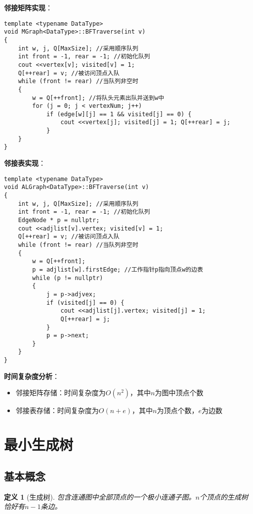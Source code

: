 \documentclass[12pt,a4paper]{amsart}
\newtheorem{definition}{定义}[section]
\begin{document}
\textbf{邻接矩阵实现}：
\begin{lstlisting}[caption=邻接矩阵的广度优先遍历]
template <typename DataType>
void MGraph<DataType>::BFTraverse(int v)
{
    int w, j, Q[MaxSize]; //采用顺序队列
    int front = -1, rear = -1; //初始化队列
    cout <<vertex[v]; visited[v] = 1;
    Q[++rear] = v; //被访问顶点入队
    while (front != rear) //当队列非空时
    {
        w = Q[++front]; //将队头元素出队并送到w中
        for (j = 0; j < vertexNum; j++)
            if (edge[w][j] == 1 && visited[j] == 0) {
                cout <<vertex[j]; visited[j] = 1; Q[++rear] = j;
            }
    }
}
\end{lstlisting}

\textbf{邻接表实现}：
\begin{lstlisting}[caption=邻接表的广度优先遍历]
template <typename DataType>
void ALGraph<DataType>::BFTraverse(int v)
{
    int w, j, Q[MaxSize]; //采用顺序队列
    int front = -1, rear = -1; //初始化队列
    EdgeNode * p = nullptr;
    cout <<adjlist[v].vertex; visited[v] = 1;
    Q[++rear] = v; //被访问顶点入队
    while (front != rear) //当队列非空时
    {
        w = Q[++front];
        p = adjlist[w].firstEdge; //工作指针p指向顶点w的边表
        while (p != nullptr)
        {
            j = p->adjvex;
            if (visited[j] == 0) {
                cout <<adjlist[j].vertex; visited[j] = 1;
                Q[++rear] = j;
            }
            p = p->next;
        }
    }
}
\end{lstlisting}

\textbf{时间复杂度分析}：
\begin{itemize}
    \item 邻接矩阵存储：时间复杂度为$O(n^2)$，其中$n$为图中顶点个数
    \item 邻接表存储：时间复杂度为$O(n+e)$，其中$n$为顶点个数，$e$为边数
\end{itemize}

\section{最小生成树}

\subsection{基本概念}

\begin{definition}[生成树]
包含连通图中全部顶点的一个极小连通子图。$n$个顶点的生成树恰好有$n-1$条边。
\end{definition}
\end{document}
